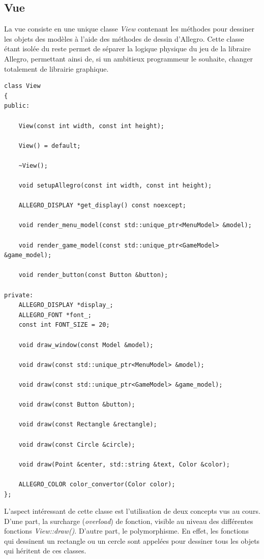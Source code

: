 \documentclass[utf8]{article}
\begin{document}
\subsection{Vue}
La vue consiste en une unique classe \emph{View} contenant les méthodes pour dessiner les objets des modèles à l'aide des méthodes de dessin d'Allegro. Cette classe étant isolée du reste permet de séparer la logique physique du jeu de la libraire Allegro, permettant ainsi de, si un ambitieux programmeur le souhaite, changer totalement de librairie graphique.

\begin{verbatim}
class View
{
public:

    View(const int width, const int height);

    View() = default;

    ~View();

    void setupAllegro(const int width, const int height);

    ALLEGRO_DISPLAY *get_display() const noexcept;

    void render_menu_model(const std::unique_ptr<MenuModel> &model);

    void render_game_model(const std::unique_ptr<GameModel> &game_model);

    void render_button(const Button &button);

private:
    ALLEGRO_DISPLAY *display_;
    ALLEGRO_FONT *font_;
    const int FONT_SIZE = 20;

    void draw_window(const Model &model);

    void draw(const std::unique_ptr<MenuModel> &model);

    void draw(const std::unique_ptr<GameModel> &game_model);

    void draw(const Button &button);

    void draw(const Rectangle &rectangle);

    void draw(const Circle &circle);

    void draw(Point &center, std::string &text, Color &color);

    ALLEGRO_COLOR color_convertor(Color color);
};
\end{verbatim}
L'aspect intéressant de cette classe est l'utilisation de deux concepts vus au cours. D'une part, la surcharge (\emph{overload}) de fonction, visible au niveau des différentes fonctions \emph{View::draw()}. D'autre part, le polymorphisme. En effet, les fonctions qui dessinent un rectangle ou un cercle sont appelées pour dessiner tous les objets qui héritent de ces classes.
\end{document}
